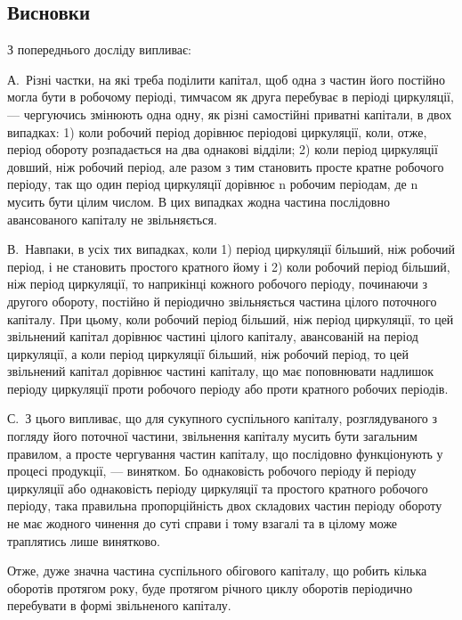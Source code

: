 
\subsection{Висновки}

З попереднього досліду випливає:

А.~Різні частки, на які треба поділити капітал, щоб одна з частин
його постійно могла бути в робочому періоді, тимчасом як друга перебуває
в періоді циркуляції, — чергуючись змінюють одна одну, як різні
самостійні приватні капітали, в двох випадках: 1) коли робочий період
дорівнює періодові циркуляції, коли, отже, період обороту розпадається
на два однакові відділи; 2) коли період циркуляції довший, ніж робочий
період, але разом з тим становить просте кратне робочого періоду, так
що один період циркуляції дорівнює n робочим періодам, де n мусить
бути цілим числом. В цих випадках жодна частина послідовно авансованого
капіталу не звільняється.

В.~Навпаки, в усіх тих випадках, коли 1) період циркуляції більший,
ніж робочий період, і не становить простого кратного йому і 2) коли
робочий період більший, ніж період циркуляції, то наприкінці кожного
робочого періоду, починаючи з другого обороту, постійно й періодично
звільняється частина цілого поточного капіталу. При цьому, коли робочий
період більший, ніж період циркуляції, то цей звільнений капітал
дорівнює частині цілого капіталу, авансованій на період циркуляції, а
коли період циркуляції більший, ніж робочий період, то цей звільнений
капітал дорівнює частині капіталу, що має поповнювати надлишок періоду
циркуляції проти робочого періоду або проти кратного робочих періодів.

С.~З цього випливає, що для сукупного суспільного капіталу, розглядуваного
з погляду його поточної частини, звільнення капіталу
мусить бути загальним правилом, а просте чергування частин капіталу,
що послідовно функціонують у процесі продукції, — винятком. Бо однаковість
робочого періоду й періоду циркуляції або однаковість періоду
циркуляції та простого кратного робочого періоду, така правильна пропорційність
двох складових частин періоду обороту не має жодного
чинення до суті справи і тому взагалі та в цілому може траплятись лише
винятково.

Отже, дуже значна частина суспільного обігового капіталу, що робить
кілька оборотів протягом року, буде протягом річного циклу оборотів
періодично перебувати в формі звільненого капіталу.

